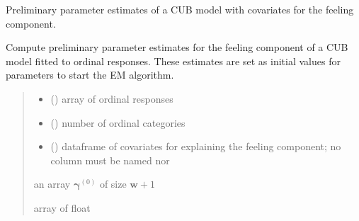 \documentclass[letterpaper,10pt,english]{sphinxmanual}
\begin{document}
\begin{fulllineitems}
\label{\detokenize{cubmods:cubmods.cub_0w.init_gamma}}
\pysigstartsignatures
{}
\pysigstopsignatures
\sphinxAtStartPar
Preliminary parameter estimates of a CUB model with covariates for the feeling component.

\sphinxAtStartPar
Compute preliminary parameter estimates for the feeling component of a CUB model 
fitted to ordinal responses.
These estimates are set as initial values for parameters to start the E\sphinxhyphen{}M algorithm.
\begin{quote}\begin{description}
\begin{itemize}
\item {} 
\sphinxAtStartPar
{} () \textendash{} array of ordinal responses

\item {} 
\sphinxAtStartPar
{} () \textendash{} number of ordinal categories

\item {} 
\sphinxAtStartPar
{} () \textendash{} dataframe of covariates for explaining the feeling component;
no column must be named  nor 

\end{itemize}

\sphinxAtStartPar
an array \(\pmb\gamma^{(0)}\) of size \(\pmb w + 1\)

\sphinxAtStartPar
array of float

\end{description}\end{quote}

\end{fulllineitems}

\end{document}
